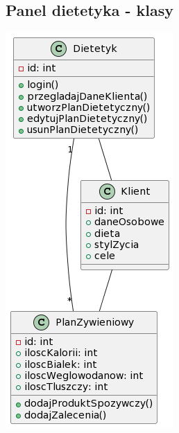 \subsection{Panel dietetyka - klasy}\label{subsec:panel-dietetyka-classes}

\includegraphics{../diagrams/class/dietetyk}
